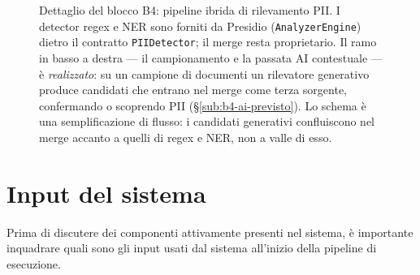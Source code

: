 \begin{figure}[htbp]
	\caption[Dettaglio del blocco B4: pipeline ibrida di rilevamento PII]{Dettaglio del blocco B4: pipeline ibrida di rilevamento PII. I detector regex e NER sono forniti da Presidio (\texttt{AnalyzerEngine}) dietro il contratto \texttt{PIIDetector}; il merge resta proprietario. Il ramo in basso a destra --- il campionamento e la passata AI contestuale --- è \emph{realizzato}: su un campione di documenti un rilevatore generativo produce candidati che entrano nel merge come terza sorgente, confermando o scoprendo PII (§\ref{sub:b4-ai-previsto}). Lo schema è una semplificazione di flusso: i candidati generativi confluiscono nel merge accanto a quelli di regex e NER, non a valle di esso.}
	\label{fig:b4-detection-pipeline}
\end{figure}

\FloatBarrier

\section{Input del sistema}
\label{sec:input-sistema}

Prima di discutere dei componenti attivamente presenti nel sistema, è importante inquadrare quali sono gli input usati dal sistema all'inizio della pipeline di esecuzione.

